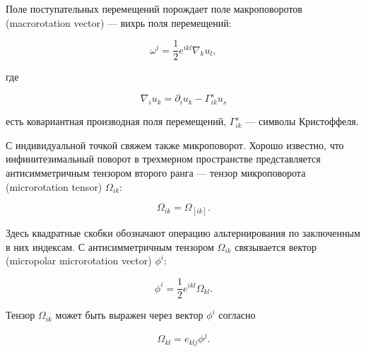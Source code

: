 Поле поступательных перемещений порождает поле макроповоротов (macrorotation vector) \cdash--- вихрь поля перемещений:

\begin{equation}

\omega^i=\dfrac{1}{2}e^{ikl}\nabla_ku_l,

\label{eq:vorticity-vector}

\end{equation}

где

\begin{equation}

\nabla_iu_k=\partial_iu_k-\Gamma^s_{ik}u_s

\end{equation}

есть ковариантная производная поля перемещений, \(\Gamma^s_{ik}\) \cdash--- символы Кристоффеля.



С индивидуальной точкой свяжем также микроповорот. Хорошо известно, что инфинитезимальный поворот в трехмерном пространстве представляется антисимметричным тензором второго ранга \cdash--- тензор микроповорота (micro\-rotation tensor) \(\Omega_{ik}\):

\begin{equation}

\Omega_{ik}=\Omega_{[ik]}.

\label{eq:microrotation-tensor}

\end{equation}

Здесь квадратные скобки обозначают операцию альтернирования по заключенным в них индексам. С антисимметричным тензором \(\Omega_{ik}\) связывается вектор (micro\-polar micro\-rotation vector) \(\phi^i\):

\begin{equation}

\phi^i=\dfrac{1}{2}e^{ikl}\Omega_{kl}.

\label{eq:microrotation-vector}

\end{equation}

Тензор \(\Omega_{ik}\) может быть выражен через вектор \(\phi^i\) согласно

\begin{equation}

\Omega_{kl}=e_{klj}\phi^j.

\end{equation}



